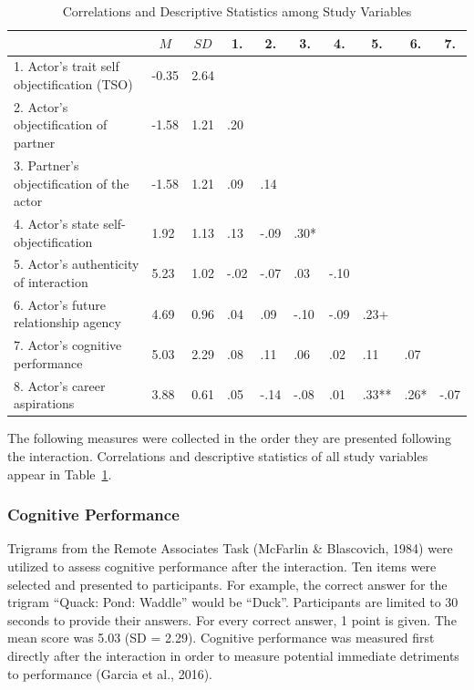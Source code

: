 \documentclass[man]{apa6}
\begin{document}
\begin{table}[tbp]
\begin{center}
\begin{threeparttable}
\caption{\label{tab:corrtable}Correlations and Descriptive Statistics among Study Variables}
\begin{tabular}{llllllllll}
\toprule
 & \multicolumn{1}{c}{$M$} & \multicolumn{1}{c}{$SD$} & \multicolumn{1}{c}{1.} & \multicolumn{1}{c}{2.} & \multicolumn{1}{c}{3.} & \multicolumn{1}{c}{4.} & \multicolumn{1}{c}{5.} & \multicolumn{1}{c}{6.} & \multicolumn{1}{c}{7.}\\
\midrule
1. Actor's trait self objectification (TSO) & -0.35 & 2.64 &  &  &  &  &  &  & \\
2. Actor's objectification of partner & -1.58 & 1.21 & .20 &  &  &  &  &  & \\
3. Partner's objectification of the actor & -1.58 & 1.21 & .09 & .14 &  &  &  &  & \\
4. Actor's state self-objectification & 1.92 & 1.13 & .13 & -.09 & .30* &  &  &  & \\
5. Actor's authenticity of interaction & 5.23 & 1.02 & -.02 & -.07 & .03 & -.10 &  &  & \\
6. Actor's future relationship agency & 4.69 & 0.96 & .04 & .09 & -.10 & -.09 & .23+ &  & \\
7. Actor's cognitive performance & 5.03 & 2.29 & .08 & .11 & .06 & .02 & .11 & .07 & \\
8. Actor's career aspirations & 3.88 & 0.61 & .05 & -.14 & -.08 & .01 & .33** & .26* & -.07\\
\bottomrule
\end{tabular}
\end{threeparttable}
\end{center}
\end{table}

The following measures were collected in the order they are presented
following the interaction. Correlations and descriptive statistics of
all study variables appear in Table~\ref{tab:corrtable}.

\subsubsection{Cognitive Performance}\label{cognitive-performance}

Trigrams from the Remote Associates Task (McFarlin \& Blascovich, 1984)
were utilized to assess cognitive performance after the interaction. Ten
items were selected and presented to participants. For example, the
correct answer for the trigram \enquote{Quack: Pond: Waddle} would be
\enquote{Duck}. Participants are limited to 30 seconds to provide their
answers. For every correct answer, 1 point is given. The mean score was
5.03 (SD = 2.29). Cognitive performance was measured first directly
after the interaction in order to measure potential immediate detriments
to performance (Garcia et al., 2016).
\end{document}
